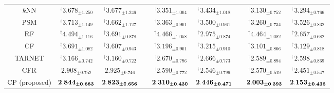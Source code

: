 \begin{table}[tbp]
{\begin{tabular} {ccccccccc }
\cmidrule{1-9}
\multicolumn{1}{c}{$k$NN} &    $^\dagger3.678_{\pm{1.250}}$   &   $^\dagger3.677_{\pm{1.246}}$  & \multicolumn{1}{l}{} &   $^\dagger3.351_{\pm{1.004}}$&   $^\dagger3.434_{\pm{1.018}}$  &  &  $^\dagger3.130_{\pm{0.752}}$ & $^\dagger3.294_{\pm{0.766}}$      \\[3pt]
\multicolumn{1}{c}{PSM}    &  $^\dagger3.713_{\pm{1.149}}$  &  $^\dagger3.662_{\pm{1.127}}$ & \multicolumn{1}{l}{} &   $^\dagger3.363_{\pm{0.901}}$  &  $^\dagger3.500_{\pm{0.961}}$  &  &   $^\dagger3.260_{\pm{0.734}}$& $^\dagger3.526_{\pm{0.832}}$      \\[3pt]
\cmidrule{1-9}
\multicolumn{1}{c}{RF}    &  $^\dagger4.494_{\pm{1.116}}$  &    $^\dagger3.691_{\pm{0.878}}$   & \multicolumn{1}{l}{} &    $^\dagger4.466_{\pm{1.058}}$   &  $^\dagger2.975_{\pm{0.874}}$    &  &  $^\dagger4.464_{\pm{1.082}}$ & $^\dagger2.657_{\pm{0.682}}$     \\[3pt]
\multicolumn{1}{c}{CF}    &  $^\dagger3.691_{\pm{1.082}}$  &    $^\dagger3.607_{\pm{0.943}}$   & \multicolumn{1}{l}{} &  $^\dagger3.196_{\pm{0.901}}$ & $^\dagger3.215_{\pm{0.910}}$ &  & $^\dagger3.101_{\pm{0.806}}$ & $^\dagger3.129_{\pm{0.818}}$ \\[3pt]
\cmidrule{1-9}
\multicolumn{1}{c}{TARNET}    &        $^\dagger3.166_{\pm{0.742}}$       &       $^\ddagger3.160_{\pm{0.722}}$         & \multicolumn{1}{l}{} &   $^\dagger2.670_{\pm{0.796}}$  &   $^\dagger2.666_{\pm{0.773}}$      &  &   $^\dagger2.589_{\pm{0.894}}$ & $^\dagger2.598_{\pm{0.869}}$      \\[3pt]
\multicolumn{1}{c}{CFR}    &        $2.908_{\pm{0.752}}$       &       $2.925_{\pm{0.746}}$         & \multicolumn{1}{l}{} &   $^\dagger2.590_{\pm{0.772}}$   &  $^\dagger2.546_{\pm{0.796}}$   &  &   $^\dagger2.570_{\pm{0.519}}$& $^\dagger2.451_{\pm{0.547}}$      \\[3pt]
\cmidrule{1-9}
CP (proposed) &        $\bf 2.844_{\pm{0.683}}$       &       $\bf 2.823_{\pm{0.656}}$        & \multicolumn{1}{l}{} &     $\bf 2.310_{\pm{0.430}}$          & $\bf 2.446_{\pm{0.471}}$       &  &   $\bf 2.003_{\pm{0.393}} $& $\bf 2.153_{\pm{0.436}}$      \\[3pt]
\bottomrule[2pt]
    \end{tabular}
    }
\end{table}
